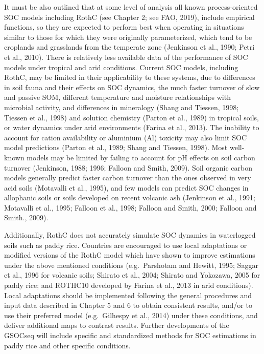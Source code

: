 \documentclass[
  10pt,
  b5paper,
]{book}
\begin{document}
It must be also outlined that at some level of analysis all known process-oriented SOC models including RothC (see Chapter 2; see FAO, 2019), include empirical functions, so they are expected to perform best when operating in situations similar to those for which they were originally parameterized, which tend to be croplands and grasslands from the temperate zone (Jenkinson et al., 1990; Petri et al., 2010). There is relatively less available data of the performance of SOC models under tropical and arid conditions. Current SOC models, including RothC, may be limited in their applicability to these systems, due to differences in soil fauna and their effects on SOC dynamics, the much faster turnover of slow and passive SOM, different temperature and moisture relationships with microbial activity, and differences in mineralogy (Shang and Tiessen, 1998; Tiessen et al., 1998) and solution chemistry (Parton et al., 1989) in tropical soils, or water dynamics under arid environments (Farina et al., 2013). The inability to account for cation availability or aluminium (Al) toxicity may also limit SOC model predictions (Parton et al., 1989; Shang and Tiessen, 1998). Most well-known models may be limited by failing to account for pH effects on soil carbon turnover (Jenkinson, 1988; 1996; Falloon and Smith, 2009). Soil organic carbon models generally predict faster carbon turnover than the ones observed in very acid soils (Motavalli et al., 1995), and few models can predict SOC changes in allophanic soils or soils developed on recent volcanic ash (Jenkinson et al., 1991; Motavalli et al., 1995; Falloon et al., 1998; Falloon and Smith, 2000; Falloon and Smith., 2009).

Additionally, RothC does not accurately simulate SOC dynamics in waterlogged soils such as paddy rice. Countries are encouraged to use local adaptations or modified versions of the RothC model which have shown to improve estimations under the above mentioned conditions (e.g.~Parshotam and Hewitt, 1995; Saggar et al., 1996 for volcanic soils; Shirato et al., 2004; Shirato and Yokozawa, 2005 for paddy rice; and ROTHC10 developed by Farina et al., 2013 in arid conditions). Local adaptations should be implemented following the general procedures and input data described in Chapter 5 and 6 to obtain consistent results, and/or to use their preferred model (e.g.~Gilhespy et al., 2014) under these conditions, and deliver additional maps to contrast results. Further developments of the GSOCseq will include specific and standardized methods for SOC estimations in paddy rice and other specific conditions.
\end{document}

